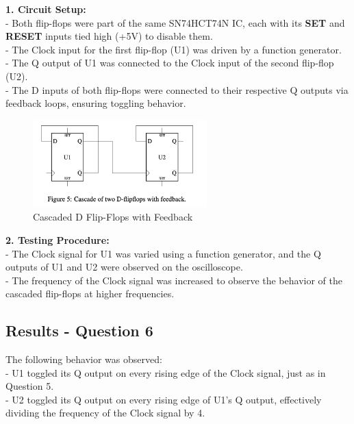 \documentclass{article}
\begin{document}
    \textbf{1. Circuit Setup:} \\
    - Both flip-flops were part of the same SN74HCT74N IC, each with its \textbf{SET} and \textbf{RESET} inputs tied high (+5V) to disable them. \\
    - The Clock input for the first flip-flop (U1) was driven by a function generator. \\
    - The Q output of U1 was connected to the Clock input of the second flip-flop (U2). \\
    - The D inputs of both flip-flops were connected to their respective Q outputs via feedback loops, ensuring toggling behavior. \\

    \begin{figure}[H]
        \centering
        \includegraphics[width=0.6\textwidth]{./img/Lab 11/11_6_1.png} 
        \caption{Cascaded D Flip-Flops with Feedback}
        \label{fig:Cascaded_FlipFlops}
    \end{figure}

    \textbf{2. Testing Procedure:} \\
    - The Clock signal for U1 was varied using a function generator, and the Q outputs of U1 and U2 were observed on the oscilloscope. \\
    - The frequency of the Clock signal was increased to observe the behavior of the cascaded flip-flops at higher frequencies. \\

    \subsection*{\textbf{Results - Question 6}}
    The following behavior was observed: \\
    - U1 toggled its Q output on every rising edge of the Clock signal, just as in Question 5. \\
    - U2 toggled its Q output on every rising edge of U1’s Q output, effectively dividing the frequency of the Clock signal by 4. \\
\end{document}
